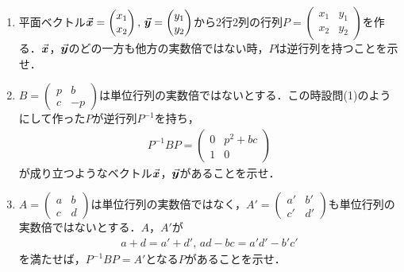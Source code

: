 \documentclass[../../main.tex]{subfiles}
\begin{document}
\begin{enumerate}
  \item 平面ベクトル$\va*{x}=
    \begin{pmatrix}x_1\\x_2
    \end{pmatrix},\,\va*{y}=
    \begin{pmatrix}y_1\\y_2
    \end{pmatrix}$から2行2列の行列$P=
    \begin{pmatrix} x_1&y_1 \\ x_2&y_2
    \end{pmatrix}$を作る．$\va*{x}$，$\va*{y}$のどの一方も他方の実数倍ではない時，$P$は逆行列を持つことを示せ．
  \item $B=
    \begin{pmatrix} p&b \\ c&-p
    \end{pmatrix}$は単位行列の実数倍ではないとする．この時設問(1)のようにして作った$P$が逆行列$P^{-1}$を持ち，
    \begin{align*}
      P^{-1}BP=
      \begin{pmatrix}
        0 & p^2+bc \\
        1 & 0
      \end{pmatrix}
    \end{align*}
    が成り立つようなベクトル$\va*{x}$，$\va*{y}$があることを示せ．
  \item $A=
    \begin{pmatrix} a&b \\ c&d
    \end{pmatrix}$は単位行列の実数倍ではなく，$A'=
    \begin{pmatrix} a'&b' \\ c'&d'
    \end{pmatrix}$も単位行列の実数倍ではないとする．$A$，$A'$が
    \begin{align*}
      a+d=a'+d',\, ad-bc=a'd'-b'c'
    \end{align*}
    を満たせば，$P^{-1}BP=A'$となる$P$があることを示せ．
\end{enumerate}
\end{document}
